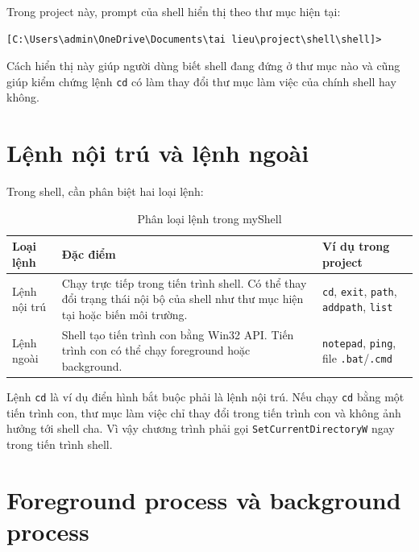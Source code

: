 \documentclass[13pt,a4paper,oneside]{extreport}
\begin{document}
Trong project này, prompt của shell hiển thị theo thư mục hiện tại:

\begin{lstlisting}[language={},caption={Dạng prompt của myShell}]
[C:\Users\admin\OneDrive\Documents\tai lieu\project\shell\shell]>
\end{lstlisting}

Cách hiển thị này giúp người dùng biết shell đang đứng ở thư mục nào và cũng giúp kiểm chứng lệnh \texttt{cd} có làm thay đổi thư mục làm việc của chính shell hay không.

\section{Lệnh nội trú và lệnh ngoài}

Trong shell, cần phân biệt hai loại lệnh:

\begin{table}[H]
	\centering
	\renewcommand{\arraystretch}{1.25}
	\begin{tabularx}{\textwidth}{|p{3.2cm}|X|X|}
		\hline
		\textbf{Loại lệnh} & \textbf{Đặc điểm}                                                                                                             & \textbf{Ví dụ trong project}                                               \\
		\hline
		Lệnh nội trú       & Chạy trực tiếp trong tiến trình shell. Có thể thay đổi trạng thái nội bộ của shell như thư mục hiện tại hoặc biến môi trường. & \texttt{cd}, \texttt{exit}, \texttt{path}, \texttt{addpath}, \texttt{list} \\
		\hline
		Lệnh ngoài         & Shell tạo tiến trình con bằng Win32 API. Tiến trình con có thể chạy foreground hoặc background.                               & \texttt{notepad}, \texttt{ping}, file \texttt{.bat}/\texttt{.cmd}          \\
		\hline
	\end{tabularx}
	\caption{Phân loại lệnh trong myShell}
\end{table}

Lệnh \texttt{cd} là ví dụ điển hình bắt buộc phải là lệnh nội trú. Nếu chạy \texttt{cd} bằng một tiến trình con, thư mục làm việc chỉ thay đổi trong tiến trình con và không ảnh hưởng tới shell cha. Vì vậy chương trình phải gọi \texttt{SetCurrentDirectoryW} ngay trong tiến trình shell.

\section{Foreground process và background process}
\end{document}

